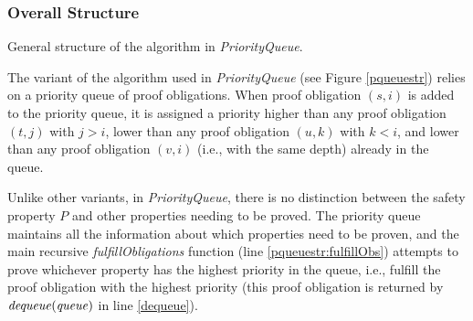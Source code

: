 \documentclass[12pt,a4paper,twoside,openright]{report}
\begin{document}
{{\subsubsection{Overall Structure}
\begin{algorithm}[t]
\DontPrintSemicolon
{}
\Fn{fulfillObligations$(M,[F_0,\ldots,F_k],{\it queue}])$ \label{pqueuestr:fulfillObs}}{
  \Let{$((s,i), {\it q}) = {\it dequeue(queue)}$ \label{dequeue}}{
  \lIf{$F_{i - 1} \wedge T \Rightarrow \neg s'$}{\Return{${\it pushFrame(M, [F_0, \dots, F_k], q, (s,i))}$} \label{pqueuestr:pushFrame}}
  }
  \lElse{\Let{${\it cti = nextCTI(F_{i - 1} \wedge T \Rightarrow \neg s')}$}{
      \If{$I \Rightarrow \neg {\it cti}$ \label{pqueuestr:preprop}}{
        \Let{${\it (fixed, [G_0, \ldots, G_k], d) = propagate([F_0 \cup \{\neg cti\}, F_1, \ldots, F_k], {\it \neg cti})}$ \label{pqueuestr:propagate}}{
          \lIf{\it fixed}{\Return{True} \label{pqueuestr:fix}}
          \Return{${\it fulfillObligation(M, [G_0 , \ldots, G_k], (generalize(\neg cti, d),d))}$ \label{pqueuestr:rec}}
        }
      }
      \lElse{\Return{False}}}}
}
\caption{General structure of the algorithm in {\it PriorityQueue}.}
\label{pqueuestr}
\end{algorithm}

The variant of the algorithm used in \emph{PriorityQueue} (see Figure \ref{pqueuestr})
relies on a priority queue of proof obligations.
When proof obligation $(s,i)$ is added to the priority queue,
it is assigned a priority higher than any proof obligation $(t,j)$ with $j > i$,
lower than any proof obligation $(u,k)$ with $k < i$, and lower
than any proof obligation $(v,i)$ (i.e., with the same depth) already in the queue.

Unlike other variants, in {\it PriorityQueue}, there is
no distinction between the safety property $P$ and other properties
needing to be proved.
The priority queue maintains all the information about which properties need to be
proven, and the main recursive {\it fulfillObligations} function (line \ref{pqueuestr:fulfillObs}) attempts to prove
whichever property has the highest priority in the queue, i.e.,
fulfill the proof obligation with the highest priority (this proof obligation
is returned by ${\it dequeue(queue)}$ in line \ref{dequeue}).

}}
\end{document}
